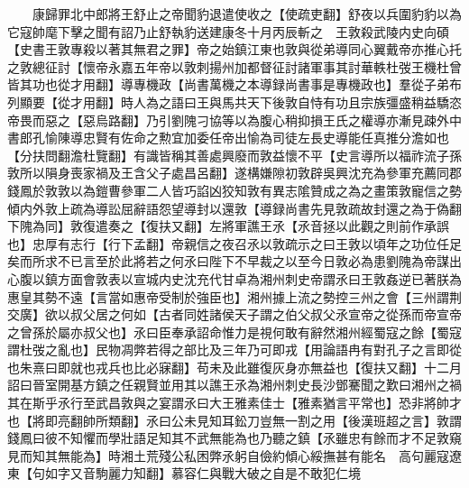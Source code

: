 　　康歸罪北中郎將王舒止之帝聞豹退遣使收之【使疏吏翻】舒夜以兵圍豹豹以為它寇帥麾下擊之聞有詔乃止舒執豹送建康冬十月丙辰斬之　王敦殺武陵内史向碩【史書王敦專殺以著其無君之罪】帝之始鎮江東也敦與從弟導同心翼戴帝亦推心托之敦總征討【懷帝永嘉五年帝以敦刺揚州加都督征討諸軍事其討華軼杜弢王機杜曾皆其功也從才用翻】導專機政【尚書萬機之本導録尚書事是專機政也】羣從子弟布列顯要【從才用翻】時人為之語曰王與馬共天下後敦自恃有功且宗族彊盛稍益驕恣帝畏而惡之【惡烏路翻】乃引劉隗刁協等以為腹心稍抑損王氏之權導亦漸見疎外中書郎孔愉陳導忠賢有佐命之勲宜加委任帝出愉為司徒左長史導能任真推分澹如也【分扶問翻澹杜覽翻】有識皆稱其善處興廢而敦益懷不平【史言導所以福祚流子孫敦所以隕身喪家禍及王含父子處昌呂翻】遂構嫌隙初敦辟吳興沈充為參軍充薦同郡錢鳳於敦敦以為鎧曹參軍二人皆巧諂凶狡知敦有異志隂贊成之為之畫策敦寵信之勢傾内外敦上疏為導訟屈辭語怨望導封以還敦【導録尚書先見敦疏故封還之為于偽翻下隗為同】敦復遣奏之【復扶又翻】左將軍譙王氶【氶音拯以此觀之則前作承誤也】忠厚有志行【行下孟翻】帝親信之夜召氶以敦疏示之曰王敦以頃年之功位任足矣而所求不已言至於此將若之何氶曰陛下不早裁之以至今日敦必為患劉隗為帝謀出心腹以鎮方面會敦表以宣城内史沈充代甘卓為湘州刺史帝謂氶曰王敦姦逆已著朕為惠皇其勢不遠【言當如惠帝受制於強臣也】湘州據上流之勢控三州之會【三州謂荆交廣】欲以叔父居之何如【古者同姓諸侯天子謂之伯父叔父氶宣帝之從孫而帝宣帝之曾孫於屬亦叔父也】氶曰臣奉承詔命惟力是視何敢有辭然湘州經蜀寇之餘【蜀寇謂杜弢之亂也】民物凋弊若得之部比及三年乃可即戎【用論語冉有對孔子之言即從也朱熹曰即就也戎兵也比必寐翻】苟未及此雖復灰身亦無益也【復扶又翻】十二月詔曰晉室開基方鎮之任親賢並用其以譙王氶為湘州刺史長沙鄧騫聞之歎曰湘州之禍其在斯乎氶行至武昌敦與之宴謂氶曰大王雅素佳士【雅素猶言平常也】恐非將帥才也【將即亮翻帥所類翻】氶曰公未見知耳鈆刀豈無一割之用【後漢班超之言】敦謂錢鳳曰彼不知懼而學壯語足知其不武無能為也乃聽之鎮【氶雖忠有餘而才不足敦窺見而知其無能為】時湘土荒殘公私困弊氶躬自儉約傾心綏撫甚有能名　高句麗寇遼東【句如字又音駒麗力知翻】慕容仁與戰大破之自是不敢犯仁境

